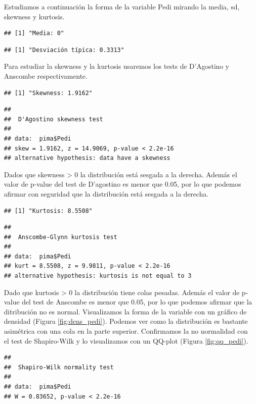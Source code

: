 \documentclass[
]{article}
\begin{document}
Estudiamos a continuación la forma de la variable Pedi mirando la media,
sd, skewness y kurtosis.

\begin{verbatim}
## [1] "Media: 0"
\end{verbatim}

\begin{verbatim}
## [1] "Desviación típica: 0.3313"
\end{verbatim}

Para estudiar la skewness y la kurtosis usaremos los tests de D'Agostino
y Anscombe respectivamente.

\begin{verbatim}
## [1] "Skewness: 1.9162"
\end{verbatim}

\begin{verbatim}
## 
##  D'Agostino skewness test
## 
## data:  pima$Pedi
## skew = 1.9162, z = 14.9069, p-value < 2.2e-16
## alternative hypothesis: data have a skewness
\end{verbatim}

Dados que skewness \textgreater{} 0 la distribución está sesgada a la
derecha. Además el valor de p-value del test de D'agostino es menor que
0.05, por lo que podemos afirmar con seguridad que la distribución está
sesgada a la derecha.

\begin{verbatim}
## [1] "Kurtosis: 8.5508"
\end{verbatim}

\begin{verbatim}
## 
##  Anscombe-Glynn kurtosis test
## 
## data:  pima$Pedi
## kurt = 8.5508, z = 9.9811, p-value < 2.2e-16
## alternative hypothesis: kurtosis is not equal to 3
\end{verbatim}

Dado que kurtosis \textgreater{} 0 la distribución tiene colas pesadas.
Además el valor de p-value del test de Anscombe es menor que 0.05, por
lo que podemos afirmar que la ditribución no es normal. Visualizamos la
forma de la variable con un gráfico de densidad (Figura
\ref{fig:dens_pedi}). Podemos ver como la distribución es bastante
asimétrica con una cola en la parte superior. Confirmamos la no
normalidad con el test de Shapiro-Wilk y lo visualizamos con un QQ-plot
(Figura \ref{fig:qq_pedi}).

\begin{verbatim}
## 
##  Shapiro-Wilk normality test
## 
## data:  pima$Pedi
## W = 0.83652, p-value < 2.2e-16
\end{verbatim}
\end{document}
